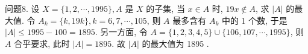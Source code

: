 问题8. 设 $X=\{1,2, \cdots, 1995\}, A$ 是 $X$ 的子集, 当 $x \in A$ 时, $19 x \notin A$, 求 $|A|$ 的最大值.
令 $A_k=\{k, 19 k\}, k=6,7, \cdots, 105$, 则 $A$ 最多含有 $A_k$ 中的 1 个数, 于是 $|A| \leqslant 1995-100=1895$. 另一方面, 令 $A=\{1,2,3,4,5\} \cup \{106,107, \cdots, 1995\}$, 则 $A$ 合乎要求, 此时 $|A|=1895$. 故 $|A|$ 的最大值为 1895 .


